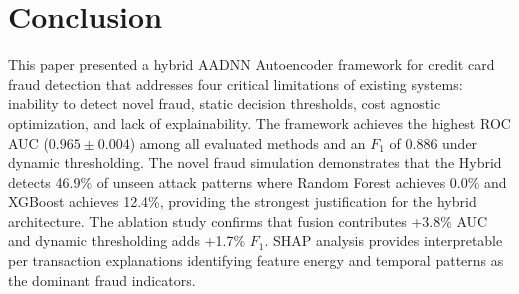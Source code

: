 \documentclass[conference]{IEEEtran}
\begin{document}
\section{Conclusion}
\label{sec:conclusion}

This paper presented a hybrid AADNN Autoencoder framework for credit card fraud detection that addresses four critical limitations of existing systems: inability to detect novel fraud, static decision thresholds, cost agnostic optimization, and lack of explainability. The framework achieves the highest ROC AUC ($0.965 \pm 0.004$) among all evaluated methods and an $F_1$ of 0.886 under dynamic thresholding. The novel fraud simulation demonstrates that the Hybrid detects 46.9\% of unseen attack patterns where Random Forest achieves 0.0\% and XGBoost achieves 12.4\%, providing the strongest justification for the hybrid architecture. The ablation study confirms that fusion contributes +3.8\% AUC and dynamic thresholding adds +1.7\% $F_1$. SHAP analysis provides interpretable per transaction explanations identifying feature energy and temporal patterns as the dominant fraud indicators.



\end{document}
